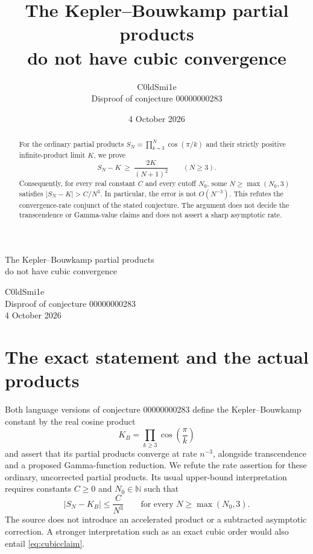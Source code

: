 \documentclass[10pt,letterpaper]{article}
\title{The Kepler--Bouwkamp partial products\\do not have cubic convergence}
\author{C0ldSmi1e\\\small Disproof of conjecture 00000000283}
\date{4 October 2026}
\newcommand{\N}{\mathbb{N}}
\begin{document}
\begin{center}
{\LARGE The Kepler--Bouwkamp partial products\\[3pt]do not have cubic convergence\par}
\vspace{10pt}
C0ldSmi1e\\[2pt]
{\small Disproof of conjecture 00000000283\\4 October 2026}
\end{center}
\vspace{3pt}
\begin{abstract}
For the ordinary partial products $S_N=\prod_{k=3}^N\cos(\pi/k)$ and their strictly positive infinite-product limit $K$, we prove
\[
S_N-K\ \ge\ \frac{2K}{(N+1)^2}\qquad(N\ge3).
\]
Consequently, for every real constant $C$ and every cutoff $N_0$, some $N\ge\max(N_0,3)$ satisfies $|S_N-K|>C/N^3$. In particular, the error is not $O(N^{-3})$. This refutes the convergence-rate conjunct of the stated conjecture. The argument does not decide the transcendence or Gamma-value claims and does not assert a sharp asymptotic rate.
\end{abstract}

\section{The exact statement and the actual products}
Both language versions of conjecture 00000000283 define the Kepler--Bouwkamp constant by the real cosine product
\[
K_B=\prod_{k\ge3}\cos\left(\frac{\pi}{k}\right)
\]
and assert that its partial products converge at rate $n^{-3}$, alongside transcendence and a proposed Gamma-function reduction. We refute the rate assertion for these ordinary, uncorrected partial products. Its usual upper-bound interpretation requires constants $C\ge0$ and $N_0\in\N$ such that
\begin{equation}\label{eq:cubicclaim}
|S_N-K_B|\le \frac{C}{N^3}\qquad\text{for every }N\ge\max(N_0,3).
\end{equation}
The source does not introduce an accelerated product or a subtracted asymptotic correction. A stronger interpretation such as an exact cubic order would also entail \eqref{eq:cubicclaim}.
\end{document}
